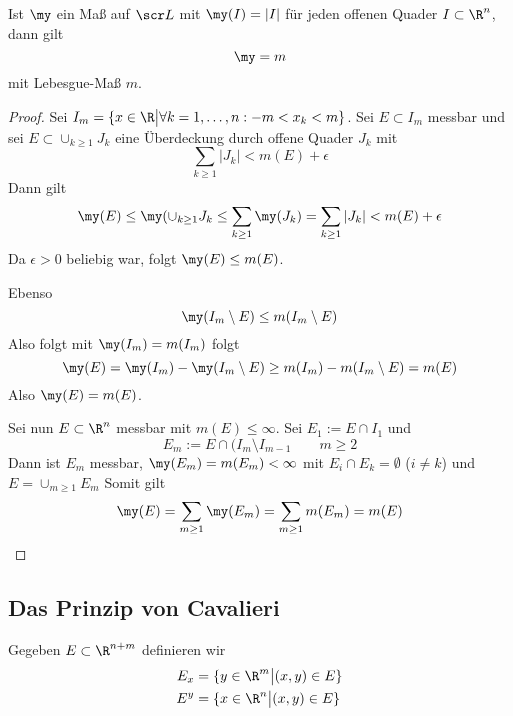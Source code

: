 \documentclass[a4paper,10pt]{scrartcl}
\begin{document}
\begin{thm}
	\label{16.8}
	Ist $\my$ ein Maß auf $\scr L$ mit $\my(I) = |I|$ für jeden offenen Quader $I\subset \R^n$, dann gilt
	\[
		\my = m
	\]
	mit Lebesgue-Maß $m$.
	\begin{proof}
		Sei $I_m = \{x\in \R\big| \forall k=1,\dotsc,n: -m<x_k<m\}$.
		Sei $E\subset I_m$ messbar und sei $E\subset \cup_{k\ge 1}J_k$ eine Überdeckung durch offene Quader $J_k$ mit
		\[
			\sum_{k\ge 1}|J_k| < m(E) + \epsilon
		\]
		Dann gilt
		\[
			\my(E)  \le \my(\cup_{k\ge 1} J_k \le \sum_{k\ge 1}\my(J_k) = \sum_{k\ge 1}|J_k| < m(E) +\epsilon
		\]
		Da $\epsilon >0$ beliebig war, folgt $\my(E) \le m(E)$.

		Ebenso
		\[
			\my(I_m \setminus E) \le m(I_m \setminus E)
		\]
		Also folgt mit $\my(I_m) = m(I_m)$ folgt
		\[
			\my(E) = \my(I_m) - \my(I_m\setminus E) \ge m(I_m) - m(I_m\setminus E) = m(E)
		\]
		Also $\my(E) = m(E)$.

		Sei nun $E\subset \R^n$ messbar mit $m(E) \le \infty$.
		Sei $E_1 := E \cap I_1$ und
		\[
			E_m := E \cap ( I_m\setminus I_{m-1} \qquad m\ge2
		\]
		Dann ist $E_m$ messbar, $\my(E_m) = m(E_m)<\infty$ mit
		$E_i\cap E_k=\emptyset$ ($i\neq k$) und $E= \cup_{m\ge 1}E_m$
		Somit gilt
		\[
			\my(E) = \sum_{m\ge 1}\my(E_m) = \sum_{m\ge 1}m(E_m) = m(E)
		\]
	\end{proof}
\end{thm}


\subsection{Das Prinzip von Cavalieri}


\begin{df*}
	Gegeben $E\subset \R^{n+m}$ definieren wir
	\begin{align*}
		E_x &= \{y\in \R^m \big| (x,y) \in E\}\\
		E^y &= \{x\in \R^n \big| (x,y) \in E\}
	\end{align*}
\end{df*}
\end{document}
